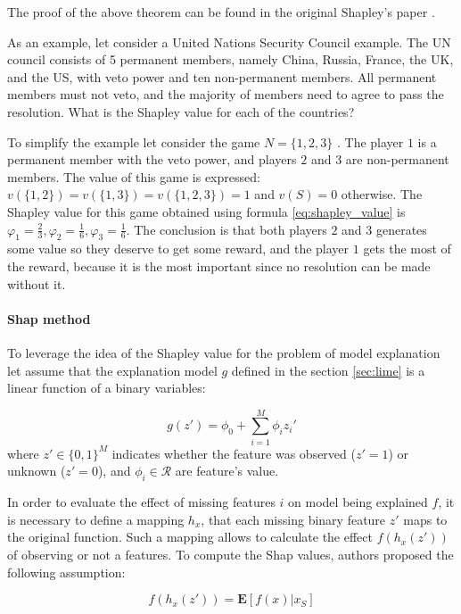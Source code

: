 The proof of the above theorem can be found in the original Shapley's paper \cite{ShapleyProof}. 

As an example, let consider a United Nations Security Council example. The UN council consists of 5 permanent members, namely China, Russia, France, the UK, and the US, with veto power and ten non-permanent members. All permanent members must not veto, and the majority of members need to agree to pass the resolution.  What is the Shapley value for each of the countries? 

To simplify the example let consider the game $N = \{1,2,3 \}$ . The player $1$ is a permanent member with the veto power, and players $2$ and $3$ are non-permanent members. The value of this game is expressed: $ v( \{1,2 \})= v( \{1,3 \})= v( \{1,2,3\})=1$ and $v(S)=0$ otherwise. 
The Shapley value for this game obtained using formula \ref{eq:shapley_value} is 
$\varphi_{1} = \frac{2}{3},\varphi_{2}= \frac{1}{6}, \varphi_{3 } =  \frac{1}{6} $.  The conclusion is that both players $2$ and $3$ generates some value so they deserve to get some reward, and the player $1$ gets the most of the reward, because it is the most important since no resolution can be made without it. 

\paragraph{Shap method} \mbox{}

To leverage the idea of the Shapley value for the problem of model explanation let assume that the explanation model $g$ defined in the section \ref{sec:lime} is a linear function of a binary variables: 

\begin{equation}
    g(z') = \phi_0 + \sum_{i=1}^{M} \phi_{i}z_i'
\end{equation}
where $z' \in \{ 0, 1\}^{M}$ indicates whether the feature was observed ($z'=1$) or unknown ($z'=0$), and $\phi_i \in \mathcal{R}$ are feature's value.

In order to evaluate the effect of missing features $i$ on model being explained $f$, it is necessary to define a mapping $h_x$, that each missing binary feature $z'$ maps to the original function. Such a mapping allows to calculate the effect $f(h_x(z'))$ of observing or not a features. To compute the Shap values, authors proposed \cite{shap} the following assumption: 

\begin{equation} \label{eq:shap assumtion}
    f(h_x(z')) = \mathbf{E}[f(x)|x_S]
\end{equation}

